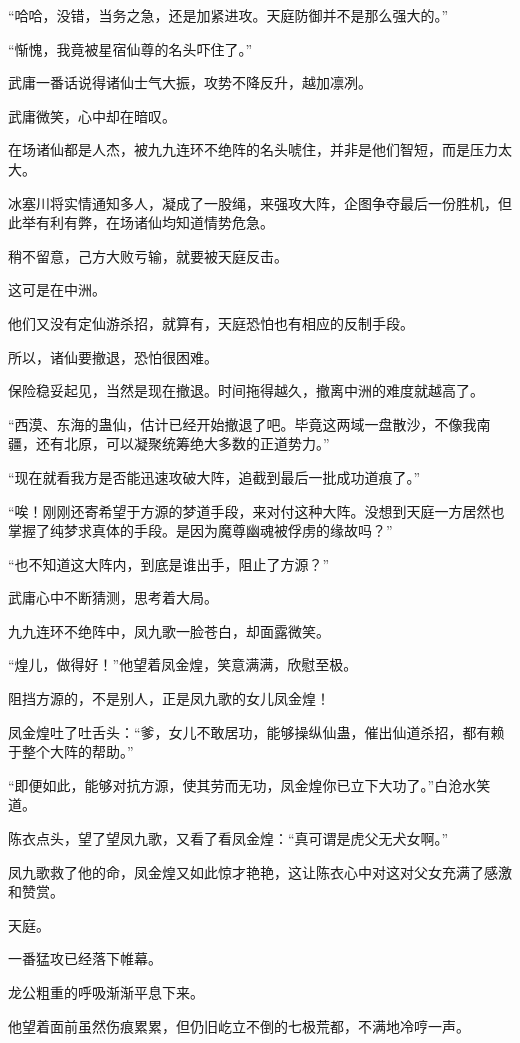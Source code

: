 \begin{this_body}
“哈哈，没错，当务之急，还是加紧进攻。天庭防御并不是那么强大的。”

“惭愧，我竟被星宿仙尊的名头吓住了。”

武庸一番话说得诸仙士气大振，攻势不降反升，越加凛冽。

武庸微笑，心中却在暗叹。

在场诸仙都是人杰，被九九连环不绝阵的名头唬住，并非是他们智短，而是压力太大。

冰塞川将实情通知多人，凝成了一股绳，来强攻大阵，企图争夺最后一份胜机，但此举有利有弊，在场诸仙均知道情势危急。

稍不留意，己方大败亏输，就要被天庭反击。

这可是在中洲。

他们又没有定仙游杀招，就算有，天庭恐怕也有相应的反制手段。

所以，诸仙要撤退，恐怕很困难。

保险稳妥起见，当然是现在撤退。时间拖得越久，撤离中洲的难度就越高了。

“西漠、东海的蛊仙，估计已经开始撤退了吧。毕竟这两域一盘散沙，不像我南疆，还有北原，可以凝聚统筹绝大多数的正道势力。”

“现在就看我方是否能迅速攻破大阵，追截到最后一批成功道痕了。”

“唉！刚刚还寄希望于方源的梦道手段，来对付这种大阵。没想到天庭一方居然也掌握了纯梦求真体的手段。是因为魔尊幽魂被俘虏的缘故吗？”

“也不知道这大阵内，到底是谁出手，阻止了方源？”

武庸心中不断猜测，思考着大局。

九九连环不绝阵中，凤九歌一脸苍白，却面露微笑。

“煌儿，做得好！”他望着凤金煌，笑意满满，欣慰至极。

阻挡方源的，不是别人，正是凤九歌的女儿凤金煌！

凤金煌吐了吐舌头：“爹，女儿不敢居功，能够操纵仙蛊，催出仙道杀招，都有赖于整个大阵的帮助。”

“即便如此，能够对抗方源，使其劳而无功，凤金煌你已立下大功了。”白沧水笑道。

陈衣点头，望了望凤九歌，又看了看凤金煌：“真可谓是虎父无犬女啊。”

凤九歌救了他的命，凤金煌又如此惊才艳艳，这让陈衣心中对这对父女充满了感激和赞赏。

天庭。

一番猛攻已经落下帷幕。

龙公粗重的呼吸渐渐平息下来。

他望着面前虽然伤痕累累，但仍旧屹立不倒的七极荒都，不满地冷哼一声。


\end{this_body}
